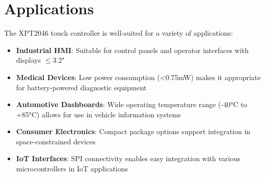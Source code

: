 \section{Applications}

The XPT2046 touch controller is well-suited for a variety of applications:

\begin{itemize}
	\item \textbf{Industrial HMI}: Suitable for control panels and operator interfaces with displays $\leq 3.2$"
	\item \textbf{Medical Devices}: Low power consumption (<0.75mW) makes it appropriate for battery-powered diagnostic equipment
	\item \textbf{Automotive Dashboards}: Wide operating temperature range (-40°C to +85°C) allows for use in vehicle information systems \cite{Allelco:2023}
	\item \textbf{Consumer Electronics}: Compact package options support integration in space-constrained devices
	\item \textbf{IoT Interfaces}: SPI connectivity enables easy integration with various microcontrollers in IoT applications
\end{itemize}